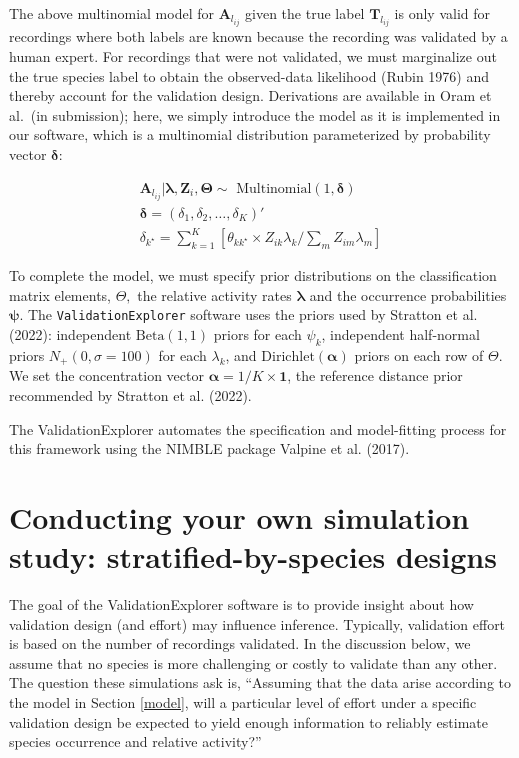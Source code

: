 \documentclass[
]{article}
\begin{document}
The above multinomial model for \(\mathbf{A}_{l_{ij}}\) given the true label \(\mathbf{T}_{l_{ij}}\) is only valid for recordings where both labels are known because the recording was validated by a human expert. For recordings that were not validated, we must marginalize out the true species label to obtain the observed-data likelihood (Rubin 1976) and thereby account for the validation design. Derivations are available in Oram et al.~(in submission); here, we simply introduce the model as it is implemented in our software, which is a multinomial distribution parameterized by probability vector \(\boldsymbol{\delta}\):

\begin{align}
  \mathbf{A}_{l_{ij}} \vert \boldsymbol{\lambda}, \mathbf{Z}_i, \boldsymbol{\Theta} \sim \text{ Multinomial}(1, \boldsymbol{\delta}) \\ 
  \boldsymbol{\delta} = (\delta_1, \delta_2, \dots, \delta_K)' \\ 
  \delta_{k^\star} = \sum_{k = 1} ^ K \left[\theta_{kk^\star} \times Z_{ik}\lambda_{k}/\sum_{m} Z_{im}\lambda_m\right]
\end{align}

To complete the model, we must specify prior distributions on the classification matrix elements, \(\Theta,\) the relative activity rates \(\boldsymbol{\lambda}\) and the occurrence probabilities \(\boldsymbol{\psi}.\) The \texttt{ValidationExplorer} software uses the priors used by Stratton et al. (2022): independent \(\text{Beta}(1,1)\) priors for each \(\psi_k\), independent half-normal priors \(N_{+}(0, \sigma = 100)\) for each \(\lambda_k\), and \(\text{Dirichlet}(\boldsymbol{\alpha})\) priors on each row of \(\Theta\). We set the concentration vector \(\boldsymbol{\alpha} = 1/K \times \boldsymbol{1}\), the reference distance prior recommended by Stratton et al. (2022).

The ValidationExplorer automates the specification and model-fitting process for this framework using the NIMBLE package Valpine et al. (2017).

\hypertarget{conducting-your-own-simulation-study-stratified-by-species-designs}{%
\section{Conducting your own simulation study: stratified-by-species designs}\label{conducting-your-own-simulation-study-stratified-by-species-designs}}

The goal of the ValidationExplorer software is to provide insight about how validation design (and effort) may influence inference. Typically, validation effort is based on the number of recordings validated. In the discussion below, we assume that no species is more challenging or costly to validate than any other. The question these simulations ask is, ``Assuming that the data arise according to the model in Section \ref{model}, will a particular level of effort under a specific validation design be expected to yield enough information to reliably estimate species occurrence and relative activity?''
\end{document}
